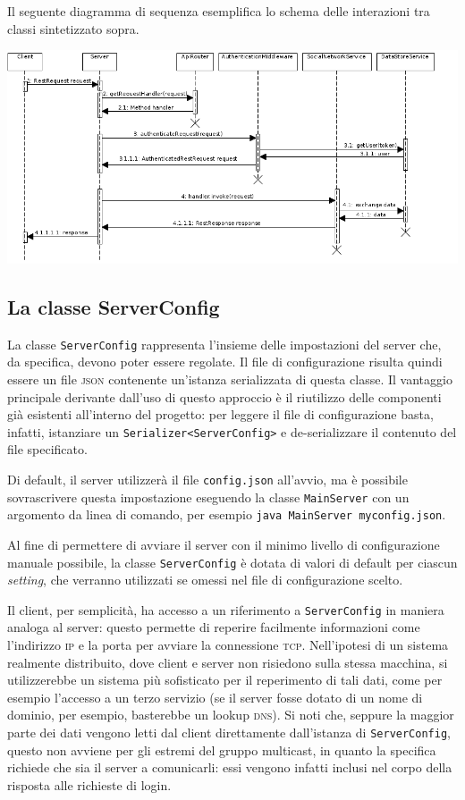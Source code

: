 \documentclass[a4paper,8pt]{article} %
\def\code#1{\texttt{#1}}
\begin{document}
\par Il seguente diagramma di sequenza esemplifica lo schema delle interazioni tra classi sintetizzato sopra.
\par \includegraphics[width=\textwidth]{sequence2.png}

\subsection{La classe ServerConfig}
La classe \code{ServerConfig} rappresenta l'insieme delle impostazioni del server che, da specifica, devono poter essere regolate.
Il file di configurazione risulta quindi essere un file \textsc{json} contenente un'istanza serializzata di questa classe. Il vantaggio principale derivante dall'uso di questo approccio è
il riutilizzo delle componenti già esistenti all'interno del progetto: per leggere il file di configurazione basta, infatti, istanziare un \code{Serializer<ServerConfig>} e de-serializzare il contenuto del file
specificato.
\par Di default, il server utilizzerà il file \code{config.json} all'avvio, ma è possibile sovrascrivere questa impostazione eseguendo la classe \code{MainServer} con un argomento da linea di comando, per esempio
\code{java MainServer myconfig.json}.

\par Al fine di permettere di avviare il server con il minimo livello di configurazione manuale possibile, la classe \code{ServerConfig} è dotata di valori di default per ciascun \emph{setting}, che verranno utilizzati
se omessi nel file di configurazione scelto.

\par Il client, per semplicità, ha accesso a un riferimento a \code{ServerConfig} in maniera analoga al server: questo permette di reperire facilmente informazioni come l'indirizzo \textsc{ip} e la porta per avviare la connessione \textsc{tcp}.
Nell'ipotesi di un sistema realmente distribuito, dove client e server non risiedono sulla stessa macchina, si utilizzerebbe un sistema più sofisticato per il reperimento di tali dati, come per esempio l'accesso a un terzo servizio (se
il server fosse dotato di un nome di dominio, per esempio, basterebbe un lookup \textsc{dns}). Si noti che, seppure la maggior parte dei dati vengono letti dal client direttamente dall'istanza di \code{ServerConfig}, questo
non avviene per gli estremi del gruppo multicast, in quanto la specifica richiede che sia il server a comunicarli: essi vengono infatti inclusi nel corpo della risposta alle richieste di login.
\end{document}

